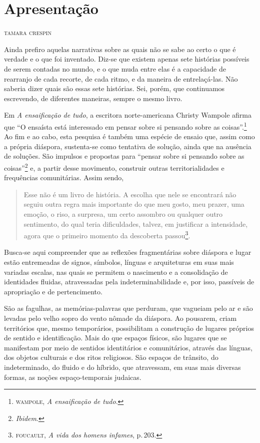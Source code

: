 \chapter*{Apresentação\smallskip{}}

\begin{flushright}
\textsc{tamara crespin}
\end{flushright}

\noindent{}Ainda prefiro aquelas narrativas sobre as quais não se sabe ao certo o que é verdade e o que foi inventado. Diz-se que existem apenas sete histórias possíveis de serem contadas no mundo, e o que muda entre elas é a capacidade de rearranjo de cada recorte, de cada ritmo, e da maneira de entrelaçá-las. Não saberia dizer quais são essas sete histórias. Sei, porém, que continuamos escrevendo, de diferentes maneiras, sempre o mesmo livro.

Em \emph{A ensaificação de tudo}, a escritora norte-americana Christy Wampole afirma que ``O ensaísta está interessado em pensar sobre si pensando sobre as coisas''.\footnote{\textsc{wampole}, \emph{A ensaificação de tudo}.} Ao fim e ao cabo, esta pesquisa é também uma espécie de ensaio que, assim como a própria diáspora, sustenta-se como tentativa de solução, ainda que na ausência de soluções. São impulsos e propostas para ``pensar sobre si pensando sobre as coisas''\footnote{\emph{Ibidem}.} e, a partir desse movimento, construir outras territorialidades e frequências comunitárias. Assim sendo,

\begin{quote}
Esse não é um livro de história. A escolha que nele se encontrará não
seguiu outra regra mais importante do que meu gosto, meu prazer, uma
emoção, o riso, a surpresa, um certo assombro ou qualquer outro
sentimento, do qual teria dificuldades, talvez, em justificar a
intensidade, agora que o primeiro momento da descoberta
passou\footnote{\textsc{foucault}, \emph{A vida dos homens infames}, p.\,203.}.
\end{quote}

Busca-se aqui compreender que as reflexões fragmentárias sobre diáspora e lugar estão entremeadas de signos, símbolos, línguas e arquiteturas em suas mais variadas escalas, nas quais se permitem o nascimento e a consolidação de identidades fluidas, atravessadas pela indeterminabilidade e, por isso, passíveis de apropriação e de pertencimento.

São as fagulhas, as memórias-palavras que perduram, que vagueiam pelo ar e são levadas pelo velho sopro do vento nômade da diáspora. Ao pousarem, criam territórios que, mesmo temporários, possibilitam a construção de lugares próprios de sentido e identificação. Mais do que espaços físicos, são lugares que se manifestam por meio de sentidos identitários e comunitários, através das línguas, dos objetos culturais e dos ritos religiosos. São espaços de trânsito, do indeterminado, do fluido e do híbrido, que atravessam, em suas mais diversas formas, as noções espaço-temporais judaicas.

